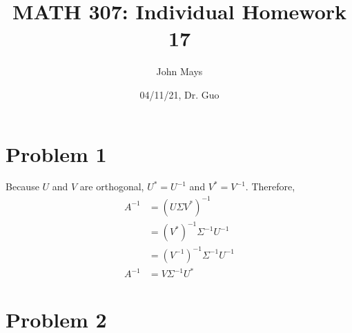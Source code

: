 \documentclass[fleqn]{article}
\title{\textbf{MATH 307: Individual Homework 17}}
\author{John Mays}
\date{04/11/21, Dr. Guo}
\begin{document}
\maketitle

\section*{Problem 1}
Because $U$ and $V$ are orthogonal, $U^{*} = U^{-1}$ and $V^{*} = V^{-1}$.  Therefore,
\begin{equation*}
    \begin{split}
        A^{-1} &= (U\Sigma V^{*})^{-1}\\
         &= (V^{*})^{-1} \Sigma ^{-1} U^{-1}\\
         &= (V^{-1})^{-1} \Sigma ^{-1} U^{-1}\\
        A^{-1} &= V \Sigma ^{-1} U^{*}
    \end{split}
\end{equation*}
\pagebreak
\section*{Problem 2}
\end{document}
